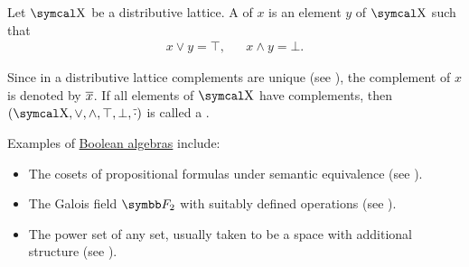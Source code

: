 \begin{definition}\label{def:boolean_algebra}
  Let \( \CX \) be a distributive lattice. A  of \( x \) is an element \( y \) of \( \CX \) such that
  \begin{align}\label{eq:def:boolean_algebra/complement}
    x \vee y = \top, && x \wedge y = \bot.
  \end{align}

  Since in a distributive lattice complements are unique (see ), the complement of \( x \) is denoted by \( \overline{x} \). If all elements of \( \CX \) have complements, then \( (\CX, \vee, \wedge, \top, \bot, \Ol \cdot) \) is called a .
\end{definition}

\begin{example}\label{ex:boolean_algebras}
  Examples of \hyperref[def:boolean_algebra]{Boolean algebras} include:

  \begin{itemize}
    \item The cosets of propositional formulas under semantic equivalence (see ).
    \item The Galois field \( \BF_2 \) with suitably defined operations (see ).
    \item The power set of any set, usually taken to be a space with additional structure (see ).
  \end{itemize}
\end{example}

